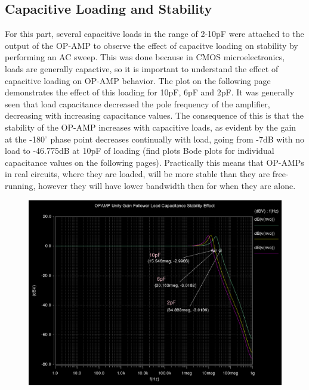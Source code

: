 \documentclass[12pt]{article}
\begin{document}
\subsection*{Capacitive Loading and Stability}
For this part, several capacitive loads in the range of 2-10pF were attached to the output of the OP-AMP to observe the effect of capacitve loading on stability by performing an AC sweep. This was done because in CMOS microelectronics, loads are generally capactive, so it is important to understand the effect of capacitive loading on OP-AMP behavior. The plot on the following page demonstrates the effect of this loading for 10pF, 6pF and 2pF. It was generally seen that load capacitance decreased the pole frequency of the amplifier, decreasing with increasing capacitance values. The consequence of this is that the stability of the OP-AMP increases with capacitive loads, as evident by the gain at the -180$^\circ$ phase point decreases continually with load, going from -7dB with no load to -46.775dB at 10pF of loading (find plots Bode plots for individual capacitance values on the following pages). Practically this means that OP-AMPs in real circuits, where they are loaded, will be more stable than they are free-running, however they will have lower bandwidth then for when they are alone.
\FloatBarrier
\begin{figure}[h!] 
\begin{center}
 \includegraphics[scale=0.35]{./cap.png}
\end{center}
\end{figure}
\end{document}
